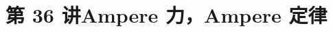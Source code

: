 \documentclass[UTF8,zihao=-4,oneside,openany]{ctexbook}
\begin{document}
\setcounter{page}{1}
\setcounter{equation}{0}

\section*{第 36 讲\quad Ampere 力，Ampere 定律}


\end{document}
